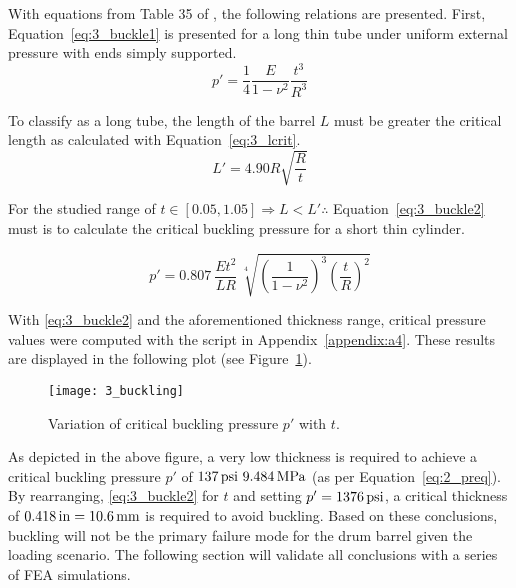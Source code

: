 With equations from Table 35 of \cite{roarks}, the following relations are presented. First, Equation~\ref{eq:3_buckle1} is presented for a long thin tube under uniform external pressure with ends simply supported.
\begin{equation}
	\label{eq:3_buckle1}
	p' =\frac{1}{4} \frac{E}{1-\nu^2} \frac{t^3}{R^3}
\end{equation}

To classify as a long tube, the length of the barrel $L$ must be greater the critical length as calculated with Equation~\ref{eq:3_lcrit}.
\begin{equation}
	\label{eq:3_lcrit}
	L' = 4.90 R \sqrt{\frac{R}{t}}
\end{equation}

For the studied range of $t \in [0.05, 1.05] \Rightarrow L < L' \therefore$ Equation~\ref{eq:3_buckle2} must is to calculate the critical buckling pressure for a short thin cylinder.

\begin{equation}
	\label{eq:3_buckle2}
	p' =0.807\  \frac{Et^2}{LR}\  \sqrt[4]{\left( \frac{1}{1-\nu^2} \right)^3 \left( \frac{t}{R}\right)^2}
\end{equation}

With \ref{eq:3_buckle2} and the aforementioned thickness range, critical pressure values were computed with the \cite{PYTHON} script in Appendix~\ref{appendix:a4}. These results are displayed in the following plot (see Figure~\ref{fig:3_buckling}).

\begin{figure}[H]
	\centering
	\texttt{[image: 3\_buckling]}
	\caption{Variation of critical buckling pressure $p'$ with $t$.}
	\label{fig:3_buckling}
\end{figure}

As depicted in the above figure, a very low thickness is required to achieve a critical buckling pressure $p'$ of $137\,\mathrm{psi} \/\ 9.484\,\mathrm{MPa}$ (as per Equation~\ref{eq:2_preq}).\\

By rearranging, \ref{eq:3_buckle2} for $t$ and setting $p'=1376\,\mathrm{psi}$, a critical thickness of $0.418\,\mathrm{in}= 10.6\,\mathrm{mm}$ is required to avoid buckling. Based on these conclusions, buckling will not be the primary failure mode for the drum barrel given the loading scenario. The following section will validate all conclusions with a series of FEA simulations.



